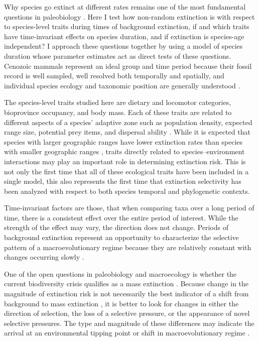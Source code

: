 \documentclass[12pt]{article}
\begin{document}
Why species go extinct at different rates remains one of the most fundamental questions in paleobiology \cite{Simpson1944,VanValen1973,Raup1994,Quental2013,Wagner2014b}. Here I test how non-random extinction is with respect to species-level traits during times of background extinction, if and which traits have time-invariant effects on species duration, and if extinction is species-age independent? I approach these questions together by using a model of species duration whose parameter estimates act as direct tests of these questions. Cenozoic mammals represent an ideal group and time period because their fossil record is well sampled, well resolved both temporally and spatially, and individual species ecology and taxonomic position are generally understood \cite{Alroy2009,Liow2008,Smith2004,Quental2013,Simpson1944,Tomiya2013,Marcot2014}. 

The species-level traits studied here are dietary and locomotor categories, bioprovince occupancy, and body mass. Each of these traits are related to different aspects of a species' adaptive zone such as population density, expected range size, potential prey items, and dispersal ability \cite{Smith2004,Jernvall2004}. While it is expected that species with larger geographic ranges have lower extinction rates than species with smaller geographic ranges \cite{Jablonski1986,Roy2009c}, traits directly related to species--environment interactions may play an important role in determining extinction risk. This is not only the first time that all of these ecological traits have been included in a single model, this also represents the first time that extinction selectivity has been analyzed with respect to both species temporal and phylogenetic contexts.

Time-invariant factors are those, that when comparing taxa over a long period of time, there is a consistent effect over the entire period of interest. While the strength of the effect may vary, the direction does not change. Periods of background extinction represent an opportunity to characterize the selective pattern of a macroevolutionary regime because they are relatively constant with changes occurring slowly \cite{Jablonski1986,Raup1988}.

One of the open questions in paleobiology and macroecology is whether the current biodiversity crisis qualifies as a mass extinction \cite{Alroy2010,Barnosky2011,Barnosky2012a}. Because change in the magnitude of extinction risk is not necessarily the best indicator of a shift from background to mass extinction \cite{Wang2003}, it is better to look for changes in either the direction of selection, the loss of a selective pressure, or the appearance of novel selective pressures. The type and magnitude of these differences may indicate the arrival at an environmental tipping point or shift in macroevolutionary regime \cite{Jablonski1986}.
\end{document}
